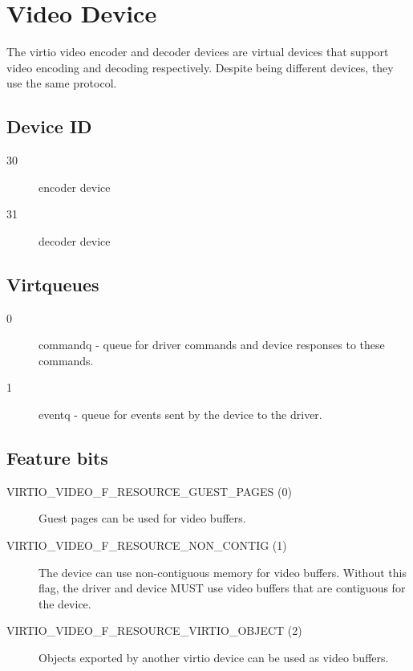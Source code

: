 \section{Video Device}\label{sec:Device Types / Video Device}

The virtio video encoder and decoder devices are virtual devices that support
video encoding and decoding respectively. Despite being different devices, they
use the same protocol.

\subsection{Device ID}
\label{sec:Device Types / Video Device / Device ID}

\begin{description}
\item[30] encoder device
\item[31] decoder device
\end{description}

\subsection{Virtqueues}
\label{sec:Device Types / Video Device / Virtqueues}

\begin{description}
\item[0] commandq - queue for driver commands and device responses to these
  commands.
\item[1] eventq - queue for events sent by the device to the driver.
\end{description}

\subsection{Feature bits}
\label{sec:Device Types / Video Device / Feature bits}

\begin{description}
\item[VIRTIO_VIDEO_F_RESOURCE_GUEST_PAGES (0)] Guest pages can be used for video
  buffers.
\item[VIRTIO_VIDEO_F_RESOURCE_NON_CONTIG (1)] The device can use
  non-contiguous memory for video buffers. Without this flag, the
  driver and device MUST use video buffers that are contiguous for the device.
\item[VIRTIO_VIDEO_F_RESOURCE_VIRTIO_OBJECT (2)] Objects exported by
  another virtio device can be used as video buffers.
\end{description}

